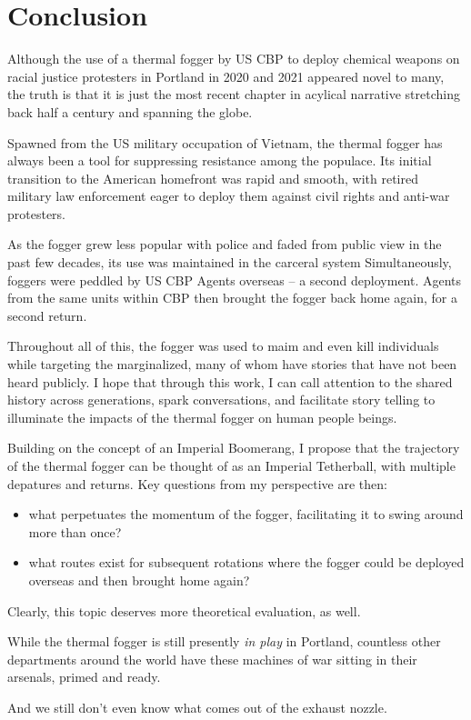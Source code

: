 \documentclass[
  11pt,
  titlepage]{krantz}
\providecommand{\tightlist}{%
  \setlength{\itemsep}{0pt}\setlength{\parskip}{0pt}}
\begin{document}
\hypertarget{Conclusion}{%
\chapter*{Conclusion}\label{Conclusion}}


Although the use of a thermal fogger by US CBP to deploy chemical weapons on racial justice protesters in Portland in 2020 and 2021 appeared novel to many, the truth is that it is just the most recent chapter in acylical narrative stretching back half a century and spanning the globe.

Spawned from the US military occupation of Vietnam, the thermal fogger has always been a tool for suppressing resistance among the populace.
Its initial transition to the American homefront was rapid and smooth, with retired military law enforcement eager to deploy them against civil rights and anti-war protesters.

As the fogger grew less popular with police and faded from public view in the past few decades, its use was maintained in the carceral system
Simultaneously, foggers were peddled by US CBP Agents overseas -- a second deployment.
Agents from the same units within CBP then brought the fogger back home again, for a second return.

Throughout all of this, the fogger was used to maim and even kill individuals while targeting the marginalized, many of whom have stories that have not been heard publicly.
I hope that through this work, I can call attention to the shared history across generations, spark conversations, and facilitate story telling to illuminate the impacts of the thermal fogger on human people beings.

Building on the concept of an Imperial Boomerang, I propose that the trajectory of the thermal fogger can be thought of as an Imperial Tetherball, with multiple depatures and returns.
Key questions from my perspective are then:

\begin{itemize}
\tightlist
\item
  what perpetuates the momentum of the fogger, facilitating it to swing around more than once?
\item
  what routes exist for subsequent rotations where the fogger could be deployed overseas and then brought home again?
\end{itemize}

Clearly, this topic deserves more theoretical evaluation, as well.

While the thermal fogger is still presently \emph{in play} in Portland, countless other departments around the world have these machines of war sitting in their arsenals, primed and ready.

And we still don't even know what comes out of the exhaust nozzle.

  

\printindex
\end{document}
